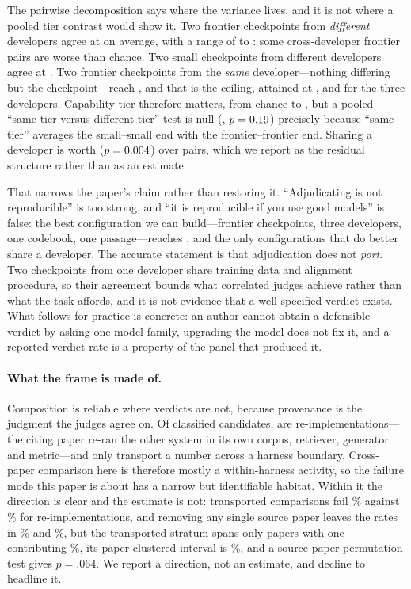 \documentclass[11pt]{article}
\begin{document}
The pairwise decomposition says where the variance lives, and it is not where a
pooled tier contrast would show it. Two frontier checkpoints from
\emph{different} developers agree at \TierCompFFCross{} on average, with a range
of \TierCompFFCrossLo{} to \TierCompFFCrossHi{}: some cross-developer frontier
pairs are worse than chance. Two small checkpoints from different developers
agree at \TierCompSSCross{}. Two frontier checkpoints from the \emph{same}
developer---nothing differing but the checkpoint---reach \TierCompFFSame{},
and that is the ceiling, attained at \TierSameDevVerdictK{}, \TierSameDevGoogleK{}
and \TierSameDevOpenAIK{} for the three developers. Capability tier therefore
matters, from chance to \TierCompFFCross{}, but a pooled ``same tier versus
different tier'' test is null (\TierTierDiff{}, $p=0.19$) precisely
because ``same tier'' averages the small--small end with the
frontier--frontier end. Sharing a developer is worth \TierDevDiff{}
($p=0.004$) over \TierNPairs{} pairs, which we report as the residual
structure rather than as an estimate.

That narrows the paper's claim rather than restoring it. ``Adjudicating is not
reproducible'' is too strong, and ``it is reproducible if you use good models''
is false: the best configuration we can build---frontier checkpoints, three
developers, one codebook, one passage---reaches \TierFrontierVerdictK{}, and the
only configurations that do better share a developer. The accurate statement is
that adjudication does not \emph{port}. Two checkpoints from one developer share
training data and alignment procedure, so their agreement bounds what correlated
judges achieve rather than what the task affords, and it is not evidence that a
well-specified verdict exists. What follows for practice is concrete: an author
cannot obtain a defensible verdict by asking one model family, upgrading the
model does not fix it, and a reported verdict rate is a property of the panel
that produced it.

\paragraph{What the frame is made of.}
Composition is reliable where verdicts are not, because provenance is the
judgment the judges agree on. Of \ProvClassified{} classified candidates,
\ProvReimplemented{} are re-implementations---the citing paper re-ran the other
system in its own corpus, retriever, generator and metric---and only
\ProvTransported{} transport a number across a harness boundary. Cross-paper
comparison here is therefore mostly a within-harness activity, so the failure
mode this paper is about has a narrow but identifiable habitat. Within it the
direction is clear and the estimate is not: transported comparisons fail
\ProvTransFail\% against \ProvReimplFail\% for re-implementations, and removing
any single source paper leaves the rates in \ProvTransLOO\% and
\ProvReimplLOO\%, but the transported stratum spans only \ProvTransPapers{}
papers with one contributing \ProvTransLargest\%, its paper-clustered interval
is \ProvTransFailCI\%, and a source-paper permutation test gives $p=.064$. We
report a direction, not an estimate, and decline to headline it.
\end{document}
